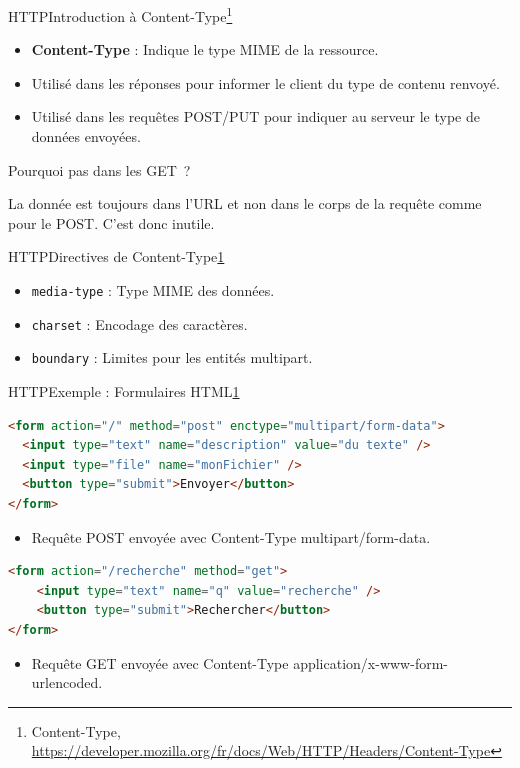 \documentclass{beamer}
\begin{document}
    \begin{frame}{HTTP}{Introduction à Content-Type\footnote{\label{mozilla-content-type}Content-Type, \url{https://developer.mozilla.org/fr/docs/Web/HTTP/Headers/Content-Type}}}
        \begin{itemize}
            \item \textbf{Content-Type} : Indique le type MIME de la ressource.
            \item Utilisé dans les réponses pour informer le client du type de contenu renvoyé.
            \item Utilisé dans les requêtes POST/PUT pour indiquer au serveur le type de données envoyées.
        \end{itemize}
        \bigbreak
        Pourquoi pas dans les GET~?

        La donnée est toujours dans l'URL et non dans le corps de la requête comme pour le POST.
        C'est donc inutile.
    \end{frame}

    \begin{frame}{HTTP}{Directives de Content-Type\cref{mozilla-content-type}}
        \begin{itemize}
            \item \lstinline{media-type} : Type MIME des données.
            \item \lstinline{charset} : Encodage des caractères.
            \item \lstinline{boundary} : Limites pour les entités multipart.
        \end{itemize}
    \end{frame}

    \begin{frame}[fragile]{HTTP}{Exemple : Formulaires HTML\cref{mozilla-content-type}}
        \begin{lstlisting}[language=HTML]
<form action="/" method="post" enctype="multipart/form-data">
  <input type="text" name="description" value="du texte" />
  <input type="file" name="monFichier" />
  <button type="submit">Envoyer</button>
</form>
        \end{lstlisting}
        \begin{itemize}
            \item Requête POST envoyée avec Content-Type multipart/form-data.
        \end{itemize}
        \begin{lstlisting}[language=HTML]
<form action="/recherche" method="get">
    <input type="text" name="q" value="recherche" />
    <button type="submit">Rechercher</button>
</form>
        \end{lstlisting}
        \begin{itemize}
            \item Requête GET envoyée avec Content-Type application/x-www-form-urlencoded.
        \end{itemize}

    \end{frame}
\end{document}
